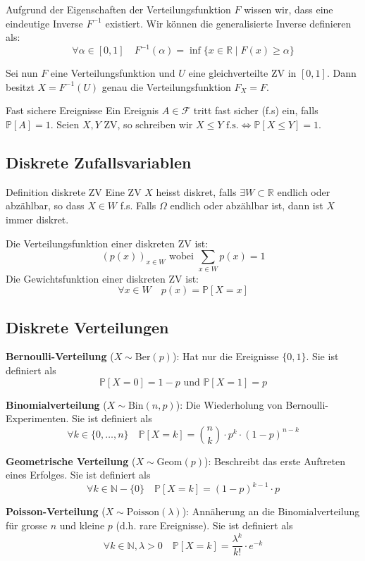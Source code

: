 \documentclass[a4paper,10pt]{article}
\def\R{\mathbb{R}}
\def\P{\mathbb{P}}
\def\F{\mathcal{F}}
\begin{document}
Aufgrund der Eigenschaften der Verteilungsfunktion \(F\) wissen wir, dass eine eindeutige Inverse $F^{-1}$ existiert. Wir können die generalisierte Inverse definieren als: \[\forall \alpha \in [0,1] \quad F^{-1}(\alpha) = \inf \{x \in \R \mid F(x) \geq \alpha\}\]

Sei nun \(F\) eine Verteilungsfunktion und \(U\) eine gleichverteilte ZV in \([0,1]\). Dann besitzt \(X = F^{-1}(U)\) genau die Verteilungsfunktion \(F_X = F\).

\begin{subbox}{Fast sichere Ereignisse}
    Ein Ereignis \(A \in \F\) tritt fast sicher (f.s) ein, falls \(\P[A] = 1\). Seien \(X, Y\) ZV, so schreiben wir \(X \le Y \text{ f.s.} \iff \P[X\le Y] = 1\).
\end{subbox}

\subsection{Diskrete Zufallsvariablen}
\begin{subbox}{Definition diskrete ZV}
    Eine ZV \(X\) heisst diskret, falls \(\exists W \subset \R\) endlich oder abzählbar, so dass \(X \in W\) f.s. Falls \(\Omega\) endlich oder abzählbar ist, dann ist \(X\) immer diskret.
\end{subbox}
\noindent Die Verteilungsfunktion einer diskreten ZV ist:
\[(p(x))_{x \in W} \text{ wobei } \sum_{x\in W} p(x) = 1\]
Die Gewichtsfunktion einer diskreten ZV ist:
\[\forall x \in W \quad p(x) = \P[X=x]\]

\subsection{Diskrete Verteilungen}
\textbf{Bernoulli-Verteilung} (\(X \sim \text{Ber}(p)\)): Hat nur die Ereignisse \(\{0,1\}\). Sie ist definiert als
\[\P[X=0] = 1-p \text{ und } \P[X=1]=p\]

\noindent \textbf{Binomialverteilung} (\(X \sim \text{Bin}(n,p)\)): Die Wiederholung von Bernoulli-Experimenten. Sie ist definiert als
\[\forall k \in \{0, \ldots, n\} \quad \P[X=k] = \binom{n}{k} \cdot p^k \cdot (1-p)^{n-k}\]

\noindent \textbf{Geometrische Verteilung} (\(X \sim \text{Geom}(p)\)): Beschreibt das erste Auftreten eines Erfolges. Sie ist definiert als
\[\forall k \in \mathbb{N} - \{0\} \quad \P[X=k]=(1-p)^{k-1}\cdot p\]

\noindent \textbf{Poisson-Verteilung} (\(X \sim \text{Poisson}(\lambda)\)): Annäherung an die Binomialverteilung für grosse \(n\) und kleine \(p\) (d.h. rare Ereignisse). Sie ist definiert als
\[\forall k \in \mathbb{N}, \lambda > 0 \quad \P[X=k]=\frac{\lambda^k}{k!}\cdot e^{-k}\]
\end{document}
